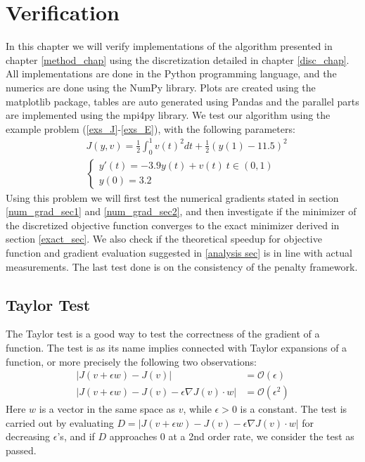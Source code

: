 \chapter{Verification}\label{Verification chapter}
In this chapter we will verify implementations of the algorithm presented in chapter \ref{method_chap} using the discretization detailed in chapter \ref{disc_chap}. All implementations are done in the Python programming language, and the numerics are done using the NumPy\cite{walt2011numpy} library. Plots are created using the matplotlib\cite{Hunter:2007} package, tables are auto generated using Pandas\cite{mckinney2010data} and the parallel parts are implemented using the mpi4py\cite{dalcin2007mpi4py} library. We test our algorithm using the example problem (\ref{exs_J}-\ref{exs_E}), with the following parameters:
\begin{align}
&J(y,v) = \frac{1}{2}\int_0^1v(t)^2dt + \frac{1}{2}(y(1)-11.5)^2 \label{test_J}\\
&\left\{
     \begin{array}{lr}
       	y'(t) = -3.9y(t)+v(t) \ t\in(0,1)\\
       	y(0)=3.2
     \end{array}
   \right. \label{test_E}
\end{align}
Using this problem we will first test the numerical gradients stated in section \ref{num_grad_sec1} and \ref{num_grad_sec2}, and then investigate if the minimizer of the discretized objective function converges to the exact minimizer derived in section \ref{exact_sec}. We also check if the theoretical speedup for objective function and gradient evaluation suggested in \ref{analysis sec} is in line with actual measurements. The last test done is on the consistency of the penalty framework. 
\section{Taylor Test} \label{Taylor_sec}
The Taylor test is a good way to test the correctness of the gradient of a function. The test is as its name implies connected with Taylor expansions of a function, or more precisely the following two observations:
\begin{align*}
|J(v+\epsilon w)-J(v)| &= \mathcal{O}(\epsilon) \\
|J(v+\epsilon w)-J(v)-\epsilon\nabla J(v)\cdot w| &= \mathcal{O}(\epsilon^2)
\end{align*}
Here $w$ is a vector in the same space as $v$, while $\epsilon>0$ is a constant. The test is carried out by evaluating $D=|J(v+\epsilon w)-J(v)-\epsilon\nabla J(v)\cdot w|$ for decreasing $\epsilon$'s, and if $D$ approaches 0 at a 2nd order rate, we consider the test as passed.
